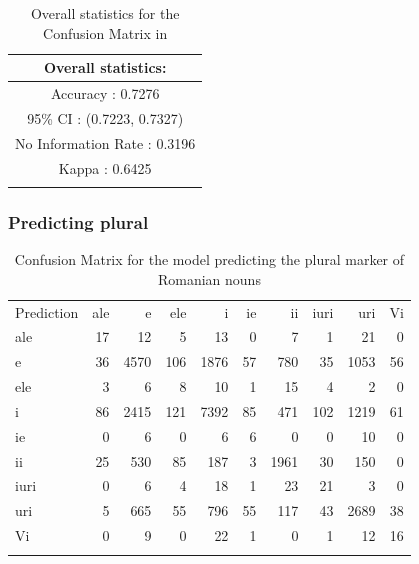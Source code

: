 \begin{table}[p]
  \centering
  \begin{tabular}{c}
    \lsptoprule
    Overall statistics: \\
    \midrule
    Accuracy : 0.7276                                 \\
    95\% CI : (0.7223, 0.7327)                        \\
    No Information Rate : 0.3196                      \\
    Kappa : 0.6425                                    \\
    \lspbottomrule
  \end{tabular}
  \caption{Overall statistics for the Confusion Matrix in }\label{tab:singular-romanian-stats}
\end{table}

\subsubsection{Predicting plural}

\begin{table}[p]
  \centering
  \begin{tabular}{lrrrrrrrrr}
    \lsptoprule
    \multicolumn{10}{c}{Reference}                                      \\
    \midrule
    Prediction & ale & e    & ele & i    & ie & ii   & iuri & uri  & Vi \\
    ale        & 17  & 12   & 5   & 13   & 0  & 7    & 1    & 21   & 0  \\
    e          & 36  & 4570 & 106 & 1876 & 57 & 780  & 35   & 1053 & 56 \\
    ele        & 3   & 6    & 8   & 10   & 1  & 15   & 4    & 2    & 0  \\
    i          & 86  & 2415 & 121 & 7392 & 85 & 471  & 102  & 1219 & 61 \\
    ie         & 0   & 6    & 0   & 6    & 6  & 0    & 0    & 10   & 0  \\
    ii         & 25  & 530  & 85  & 187  & 3  & 1961 & 30   & 150  & 0  \\
    iuri       & 0   & 6    & 4   & 18   & 1  & 23   & 21   & 3    & 0  \\
    uri        & 5   & 665  & 55  & 796  & 55 & 117  & 43   & 2689 & 38 \\
    Vi         & 0   & 9    & 0   & 22   & 1  & 0    & 1    & 12   & 16 \\
    \lspbottomrule
  \end{tabular}
  \caption{Confusion Matrix for the model predicting the plural marker of Romanian nouns}
  \label{tab:plural-romanian}
\end{table}

